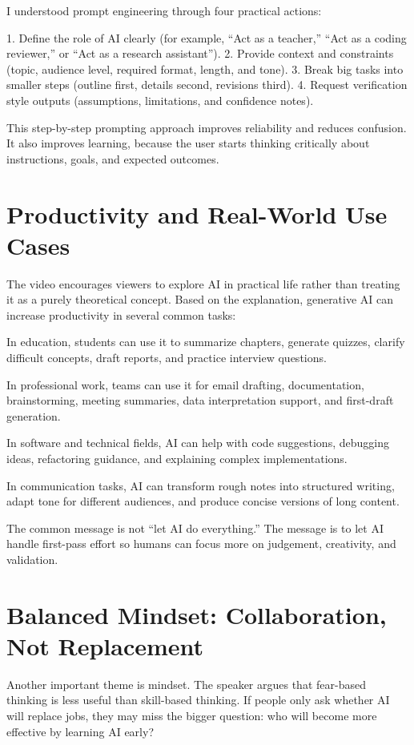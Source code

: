 \documentclass[12pt,a4paper]{article}
\begin{document}
I understood prompt engineering through four practical actions:

1. Define the role of AI clearly (for example, ``Act as a teacher,'' ``Act as a coding reviewer,'' or ``Act as a research assistant'').
2. Provide context and constraints (topic, audience level, required format, length, and tone).
3. Break big tasks into smaller steps (outline first, details second, revisions third).
4. Request verification style outputs (assumptions, limitations, and confidence notes).

This step-by-step prompting approach improves reliability and reduces confusion. It also improves learning, because the user starts thinking critically about instructions, goals, and expected outcomes.

\section*{Productivity and Real-World Use Cases}
The video encourages viewers to explore AI in practical life rather than treating it as a purely theoretical concept. Based on the explanation, generative AI can increase productivity in several common tasks:

In education, students can use it to summarize chapters, generate quizzes, clarify difficult concepts, draft reports, and practice interview questions.

In professional work, teams can use it for email drafting, documentation, brainstorming, meeting summaries, data interpretation support, and first-draft generation.

In software and technical fields, AI can help with code suggestions, debugging ideas, refactoring guidance, and explaining complex implementations.

In communication tasks, AI can transform rough notes into structured writing, adapt tone for different audiences, and produce concise versions of long content.

The common message is not ``let AI do everything.'' The message is to let AI handle first-pass effort so humans can focus more on judgement, creativity, and validation.

\section*{Balanced Mindset: Collaboration, Not Replacement}
Another important theme is mindset. The speaker argues that fear-based thinking is less useful than skill-based thinking. If people only ask whether AI will replace jobs, they may miss the bigger question: who will become more effective by learning AI early?
\end{document}

